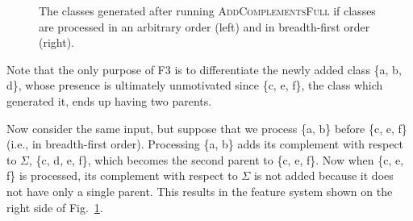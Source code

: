 \documentclass[12pt, oneside]{article}   	%
\begin{document}
\begin{figure}[htb!]
	\centering
	\qquad
	\caption{The classes generated after running \textsc{AddComplementsFull} if classes are processed in an arbitrary order (left) and in breadth-first order (right).}
	\label{fig:bfsfeats}
\end{figure}


Note that the only purpose of F3 is to differentiate the newly added class \{a, b, d\}, whose presence is ultimately unmotivated since \{c, e, f\}, the class which generated it, ends up having two parents.

Now consider the same input, but suppose that we process \{a, b\} before \{c, e, f\} (i.e., in breadth-first order). Processing \{a, b\} adds its complement with respect to $\Sigma$, \{c, d, e, f\}, which becomes the second parent to \{c, e, f\}. Now when \{c, e, f\} is processed, its complement with respect to $\Sigma$ is not added because it does not have only a single parent. This results in the feature system shown on the right side of Fig.~\ref{fig:bfsfeats}.
\end{document}
